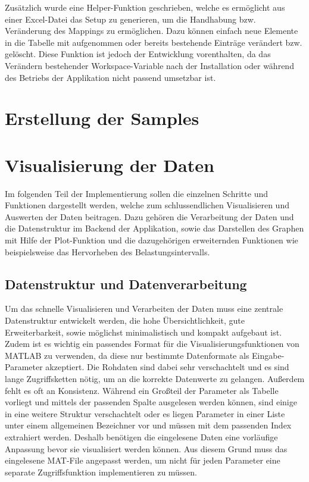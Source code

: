 Zusätzlich wurde eine Helper-Funktion geschrieben, welche es ermöglicht aus einer Excel-Datei das Setup zu generieren, um die Handhabung bzw. Veränderung des Mappings zu ermöglichen. Dazu können einfach neue Elemente in die Tabelle mit aufgenommen oder bereits bestehende Einträge verändert bzw. gelöscht. Diese Funktion ist jedoch der Entwicklung vorenthalten, da das Verändern bestehender Workspace-Variable nach der Installation oder während des Betriebs der Applikation nicht passend umsetzbar ist. 


\section{Erstellung der Samples}


\section{Visualisierung der Daten}

Im folgenden Teil der Implementierung sollen die einzelnen Schritte und Funktionen dargestellt werden, welche zum schlussendlichen Visualisieren und Auswerten der Daten beitragen. Dazu gehören die Verarbeitung der Daten und die Datenstruktur im Backend der Applikation, sowie das Darstellen des Graphen mit Hilfe der Plot-Funktion und die dazugehörigen erweiternden Funktionen wie beispielsweise das Hervorheben des Belastungsintervalls.

\subsection{Datenstruktur und Datenverarbeitung}

Um das schnelle Visualisieren und Verarbeiten der Daten muss eine zentrale Datenstruktur entwickelt werden, die hohe Übersichtlichkeit, gute Erweiterbarkeit, sowie möglichst minimalistisch und kompakt aufgebaut ist. Zudem ist es wichtig ein passendes Format für die Visualisierungsfunktionen von MATLAB zu verwenden, da diese nur bestimmte Datenformate als Eingabe-Parameter akzeptiert. Die Rohdaten sind dabei sehr verschachtelt und es sind lange Zugriffsketten nötig, um an die korrekte Datenwerte zu gelangen. Außerdem fehlt es oft an Konsistenz. Während ein Großteil der Parameter als Tabelle vorliegt und mittels der passenden Spalte ausgelesen werden können, sind einige in eine weitere Struktur verschachtelt oder es liegen Parameter in einer Liste unter einem allgemeinen Bezeichner vor und müssen mit dem passenden Index extrahiert werden. Deshalb benötigen die eingelesene Daten eine vorläufige Anpassung bevor sie visualisiert werden können. Aus diesem Grund muss das eingelesene MAT-File angepasst werden, um nicht für jeden Parameter eine separate Zugriffsfunktion implementieren zu müssen.

